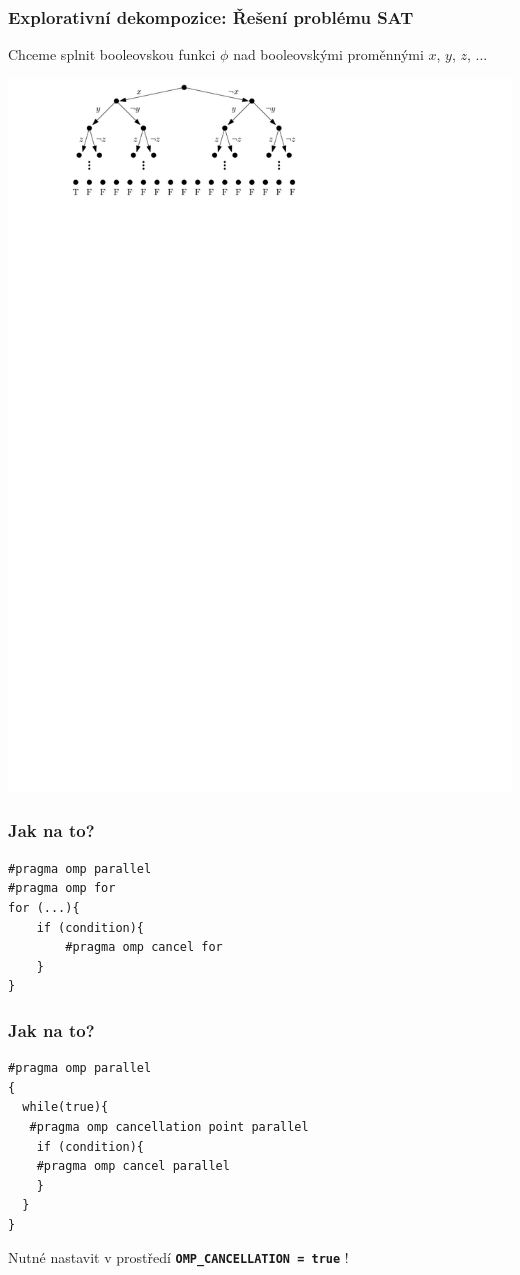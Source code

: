 \documentclass[usenames,dvipsnames,9pt]{beamer}
\begin{document}
\begin{frame}[t]
	\frametitle{Explorativní dekompozice: Řešení problému SAT}

	Chceme splnit booleovskou funkci $\phi$ nad booleovskými proměnnými $x$, $y$, $z$, ...
	\begin{05/figure}
		\centering\includegraphics[width=0.8\linewidth]{05/figs/sat2.pdf}
	\end{05/figure}
\end{frame}

{
\begin{frame}[fragile]
	\frametitle{Jak na to?}

  \begin{verbatim}
#pragma omp parallel
#pragma omp for
for (...){
    if (condition){
    	#pragma omp cancel for 
    }
}
  \end{verbatim}
\end{frame}

\begin{frame}[fragile]
	\frametitle{Jak na to?}
  \begin{verbatim}
#pragma omp parallel
{
  while(true){
   #pragma omp cancellation point parallel
    if (condition){
    #pragma omp cancel parallel
    }
  }
}
  \end{verbatim}
  
  \vspace{1em}
  {\Large \faWarning \hspace{3pt} Nutné nastavit v prostředí \texttt{\textbf{OMP\_CANCELLATION = true}} !}

  
  
\end{frame}
}
\end{document}
